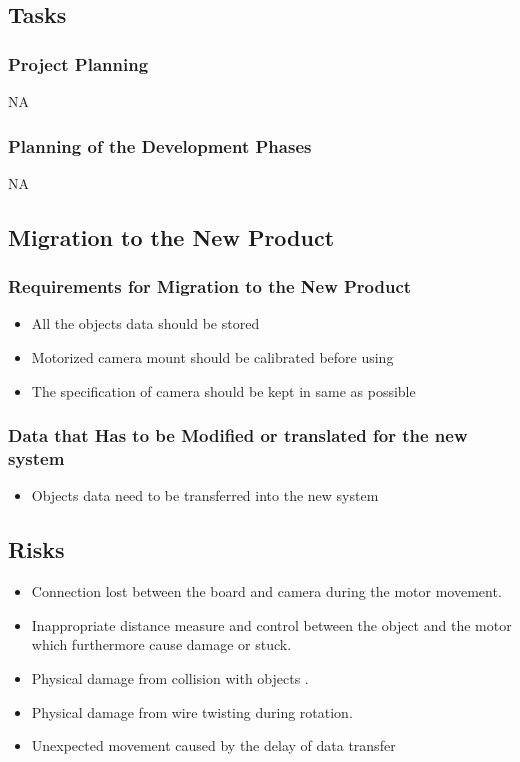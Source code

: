 \documentclass[12pt]{article}
\begin{document}
\subsection{Tasks}
    \subsubsection{Project Planning}
    NA
    
    \subsubsection{Planning of the Development Phases}
    NA
\subsection{Migration to the New Product}
    \subsubsection{Requirements for Migration to the New Product}
        \begin{itemize}
            \item All the objects data should be stored 
            \item Motorized camera mount should be calibrated before using
            \item The specification of camera should be kept in same as possible
        \end{itemize}
    \subsubsection{Data that Has to be Modified or translated for the new system}
        \begin{itemize}
            \item Objects data need to be transferred into the new system
        \end{itemize}

\subsection{Risks}
\begin{itemize}
    \item Connection lost between the board and camera during the motor movement.
    \item Inappropriate distance measure and control between the object and the motor which furthermore cause damage or stuck.
    \item Physical damage from collision with objects .
    \item Physical damage from wire twisting during rotation.
    \item Unexpected movement caused by the delay of data transfer
\end{itemize}
\end{document}
